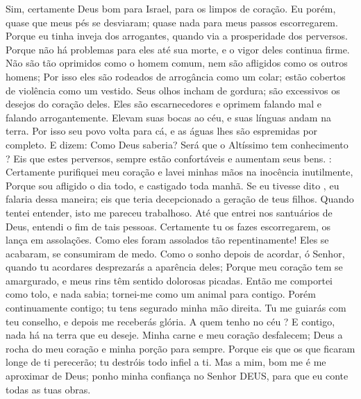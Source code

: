 {\PP 
  Sim, certamente Deus
{} bom para Israel, para os limpos de coração.
  Eu porém, quase que meus pés se desviaram; quase nada
{} para meus passos escorregarem.
  Porque eu tinha inveja dos arrogantes, quando via a prosperidade dos perversos.
  Porque não há problemas para eles até sua morte, e o vigor deles continua firme.
  Não são tão oprimidos como o homem comum, nem são afligidos como os outros homens;
  Por isso eles são rodeados de arrogância como um colar; estão cobertos de violência como
{} um vestido.
  Seus olhos incham de gordura; são excessivos os desejos do coração deles.
  Eles são escarnecedores e oprimem falando mal e falando arrogantemente.
  Elevam suas bocas ao céu, e suas línguas andam na terra.
  Por isso seu povo volta para cá, e as águas lhes são espremidas por completo.
  E dizem: Como Deus saberia? Será que o Altíssimo tem conhecimento
{} ?
  Eis que estes
{} perversos, sempre estão confortáveis e aumentam seus bens.
   : Certamente purifiquei meu coração e lavei minhas mãos na inocência inutilmente,
  Porque sou afligido o dia todo, e castigado toda manhã.
  Se eu tivesse dito
{},  eu falaria dessa maneira; eis que teria decepcionado a geração de teus filhos.
  Quando tentei entender, isto me pareceu trabalhoso.
  Até que entrei nos santuários de Deus,
{} entendi o fim de tais pessoas.
  Certamente tu os fazes escorregarem,
{} os lança em assolações.
  Como eles foram assolados tão repentinamente! Eles se acabaram,
{} se consumiram de medo.
  Como o sonho depois de acordar, ó Senhor, quando tu acordares desprezarás a aparência deles;
  Porque meu coração tem se amargurado, e meus rins têm sentido dolorosas picadas.
  Então me comportei como tolo, e nada sabia; tornei-me como um animal para contigo.
  Porém
{} continuamente contigo; tu tens segurado minha mão direita.
  Tu me guiarás com teu conselho, e depois me receberás
{} glória.
  A quem tenho no céu
{} ? E
{} contigo, nada há na terra que eu deseje.
  Minha carne e meu coração desfalecem;
{} Deus
{} a rocha do meu coração e minha porção para sempre.
  Porque eis que os que ficaram longe de ti perecerão; tu destróis todo infiel a ti.
  Mas
{} a mim, bom me é me aproximar de Deus; ponho minha confiança no Senhor DEUS, para que eu conte todas as tuas obras.
\par }

